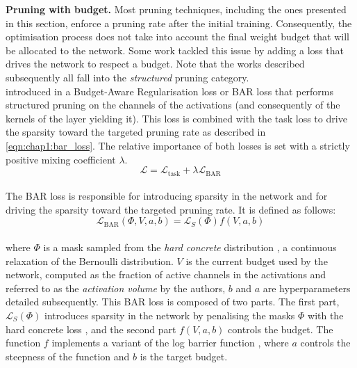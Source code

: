 \noindent \textbf{Pruning with budget.} Most pruning techniques, including the
ones presented in this section, enforce a pruning rate after the initial
training. Consequently, the optimisation process does not take into account the
final weight budget that will be allocated to the network. Some work tackled
this issue by adding a loss that drives the network to respect a budget. Note
that the works described subsequently all fall into the \emph{structured}
pruning category.\\ 

\citeauthor{lemaire2019structured} introduced in \cite{lemaire2019structured} a
Budget-Aware Regularisation loss or BAR loss that performs structured pruning on
the channels of the activations (and consequently of the kernels of the layer
yielding it). This loss is combined with the task loss to drive the sparsity
toward the targeted pruning rate as described in \cref{eqn:chap1:bar_loss}. The
relative importance of both losses is set with a strictly positive mixing
coefficient $\lambda$.\\

\begin{equation}
  \label{eqn:chap1:bar_loss}
  \mathcal{L} = \mathcal{L}_{\text{task}} + \lambda \mathcal{L}_{\text{BAR}}
\end{equation}\\

\noindent The BAR loss is responsible for introducing sparsity in the network
and for driving the sparsity toward the targeted pruning rate. It is defined as
follows:\\ 

\begin{equation}
  \mathcal{L}_{\text{BAR}}(\Phi,V,a,b) = \mathcal{L}_S(\Phi)f(V,a,b)
\end{equation}\\

\noindent where $\Phi$ is a mask sampled from the \emph{hard concrete}
distribution \cite{louizos2017learning}, a continuous relaxation of the
Bernoulli distribution. $V$ is the current budget used by the network, computed
as the fraction of active channels in the activations and referred to as the
\emph{activation volume} by the authors, $b$ and $a$ are hyperparameters detailed
subsequently. This BAR loss is composed of two parts. The first part,
$\mathcal{L}_S(\Phi)$ introduces sparsity in the network by penalising the masks
$\Phi$ with the hard concrete loss \cite{louizos2017learning}, and the second
part $f(V,a,b)$ controls the budget. The function $f$ implements a variant of
the log barrier function \cite{boyd2004convex}, where $a$ controls the steepness
of the function and $b$ is the target budget.\\


